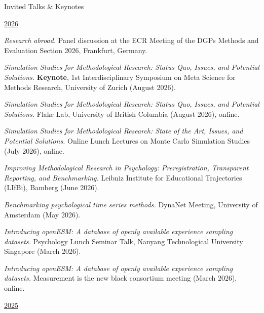 \documentclass{resume} %
\begin{document}
\begin{rSection}{Invited Talks \& Keynotes}

\underline{2026}
\begin{etaremune}

\item \textit{Research abroad.} Panel discussion at the ECR Meeting of the DGPs Methods and Evaluation Section 2026, Frankfurt, Germany.

\item \textit{Simulation Studies for Methodological Research: Status Quo, Issues, and Potential Solutions.} \textbf{Keynote}, 1st Interdisciplinary Symposium on Meta Science for Methods Research, University of Zurich (August 2026).

\item \textit{Simulation Studies for Methodological Research: Status Quo, Issues, and Potential Solutions.} Flake Lab, University of British Columbia (August 2026), online. 

\item \textit{Simulation Studies for Methodological Research: State of the Art, Issues, and Potential Solutions.} Online Lunch Lectures on Monte Carlo Simulation Studies (July 2026), online.

\item \textit{Improving Methodological Research in Psychology: Preregistration, Transparent Reporting, and Benchmarking.} Leibniz Institute for Educational Trajectories (LIfBi), Bamberg (June 2026). 

\item \textit{Benchmarking psychological time series methods.} DynaNet Meeting, University of Amsterdam (May 2026). 

\item \textit{Introducing openESM: A database of openly available experience sampling datasets.} Psychology Lunch Seminar Talk, Nanyang Technological University Singapore (March 2026). 

\item \textit{Introducing openESM: A database of openly available experience sampling datasets.} Measurement is the new black consortium meeting (March 2026), online.


\hspace{-0.75cm}\underline{2025}


\end{etaremune}
\end{rSection}
\end{document}
